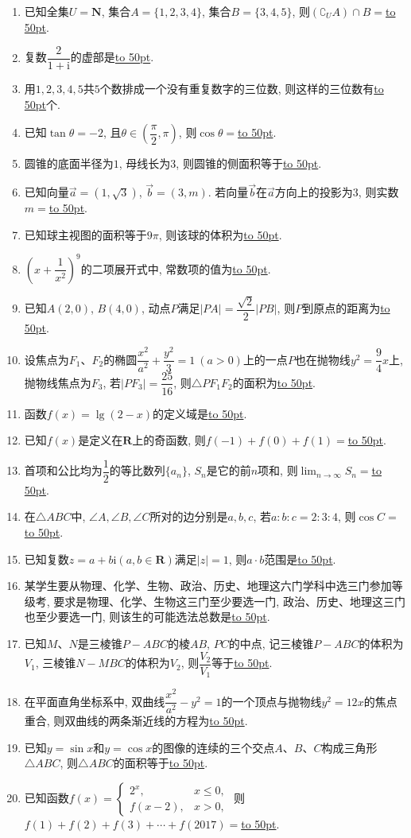 \documentclass[10pt,a4paper]{article}
\newcommand{\blank}[1]{\underline{\hbox to #1pt{}}}
\begin{document}
\begin{enumerate}[1.]

\item 已知全集$U=\mathbf{N}$, 集合$A=\{1,2,3,4\}$, 集合$B=\{3,4,5\}$, 则$(\complement_U A)\cap B=$\blank{50}.
\item 复数$\dfrac2{1+\mathrm{i}}$的虚部是\blank{50}.
\item 用$1,2,3,4,5$共$5$个数排成一个没有重复数字的三位数, 则这样的三位数有\blank{50}个.
\item 已知$\tan \theta =-2$, 且$\theta \in (\dfrac\pi 2,\pi)$, 则$\cos\theta=$\blank{50}.
\item 圆锥的底面半径为$1$, 母线长为$3$, 则圆锥的侧面积等于\blank{50}.
\item 已知向量$\overrightarrow{a}=(1,\sqrt{3})$, $\overrightarrow{b}=(3,m)$. 若向量$\overrightarrow{b}$在$\overrightarrow{a}$方向上的投影为$3$, 则实数$m=$\blank{50}.
\item 已知球主视图的面积等于$9\pi$, 则该球的体积为\blank{50}.
\item $(x+\dfrac{1}{x^2})^9$的二项展开式中, 常数项的值为\blank{50}.
\item 已知$A(2,0)$, $B(4,0)$, 动点$P$满足$|PA|=\dfrac{\sqrt2} 2|PB|$, 则$P$到原点的距离为\blank{50}.
\item 设焦点为$F_1$、$F_2$的椭圆$\dfrac{x^2}{a^2}+\dfrac{y^2}3=1 \ (a>0)$上的一点$P$也在抛物线$y^2=\dfrac94x$上, 抛物线焦点为$F_3$, 若$|PF_3|=\dfrac{25}{16}$, 则$\triangle PF_1F_2$的面积为\blank{50}.


\item 函数$f(x)=\lg(2-x)$的定义域是\blank{50}.
\item 已知$f(x)$是定义在$\mathbf{R}$上的奇函数, 则$f(-1)+f(0)+f(1)=$\blank{50}.
\item 首项和公比均为$\dfrac12$的等比数列$\{a_n\}$, $S_n$是它的前$n$项和, 则$\displaystyle\lim_{n\to\infty}S_n=$\blank{50}.
\item 在$\triangle ABC$中, $\angle A,\angle B,\angle C$所对的边分别是$a,b,c$, 若$a:b:c=2:3:4 $, 则$\cos C=$\blank{50}.
\item 已知复数$z=a+b\mathrm{i}(a,b\in \mathbf{R})$满足$|z|=1$, 则$a\cdot b$范围是\blank{50}.
\item 某学生要从物理、化学、生物、政治、历史、地理这六门学科中选三门参加等级考, 要求是物理、化学、生物这三门至少要选一门, 政治、历史、地理这三门也至少要选一门, 则该生的可能选法总数是\blank{50}.
\item 已知$M$、$N$是三棱锥$P-ABC$的棱$AB$, $PC$的中点, 记三棱锥$P-ABC$的体积为$V_1$, 三棱锥$N-MBC$的体积为$V_2$, 则$\dfrac{V_2}{V_1}$等于\blank{50}.
\item 在平面直角坐标系中, 双曲线$\dfrac{x^2}{a^2}-y^2=1 $的一个顶点与抛物线$y^2=12x$的焦点重合, 则双曲线的两条渐近线的方程为\blank{50}.
\item 已知$y=\sin x$和$y=\cos x$的图像的连续的三个交点$A$、$B$、$C$构成三角形$\triangle ABC$, 则$\triangle ABC$的面积等于\blank{50}.
\item 已知函数$f(x)=\begin{cases} 2^x, & x\le 0, \\ f(x-2), & x>0, \end{cases}$ 则$f(1)+f(2)+f(3)+\cdots+f(2017)=$\blank{50}.


\end{enumerate}
\end{document}
